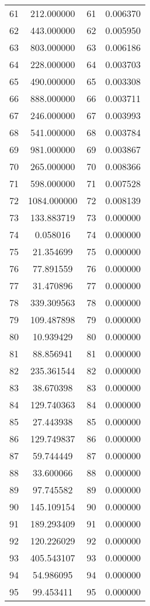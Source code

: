 \documentclass[12pt]{article}
\begin{document}
\begin{longtable}{@{}cccc@{}}
61 & 212.000000 & 61 & 0.006370 \\
62 & 443.000000 & 62 & 0.005950 \\
63 & 803.000000 & 63 & 0.006186 \\
64 & 228.000000 & 64 & 0.003703 \\
65 & 490.000000 & 65 & 0.003308 \\
66 & 888.000000 & 66 & 0.003711 \\
67 & 246.000000 & 67 & 0.003993 \\
68 & 541.000000 & 68 & 0.003784 \\
69 & 981.000000 & 69 & 0.003867 \\
70 & 265.000000 & 70 & 0.008366 \\
71 & 598.000000 & 71 & 0.007528 \\
72 & 1084.000000 & 72 & 0.008139 \\
73 & 133.883719 & 73 & 0.000000 \\
74 & 0.058016 & 74 & 0.000000 \\
75 & 21.354699 & 75 & 0.000000 \\
76 & 77.891559 & 76 & 0.000000 \\
77 & 31.470896 & 77 & 0.000000 \\
78 & 339.309563 & 78 & 0.000000 \\
79 & 109.487898 & 79 & 0.000000 \\
80 & 10.939429 & 80 & 0.000000 \\
81 & 88.856941 & 81 & 0.000000 \\
82 & 235.361544 & 82 & 0.000000 \\
83 & 38.670398 & 83 & 0.000000 \\
84 & 129.740363 & 84 & 0.000000 \\
85 & 27.443938 & 85 & 0.000000 \\
86 & 129.749837 & 86 & 0.000000 \\
87 & 59.744449 & 87 & 0.000000 \\
88 & 33.600066 & 88 & 0.000000 \\
89 & 97.745582 & 89 & 0.000000 \\
90 & 145.109154 & 90 & 0.000000 \\
91 & 189.293409 & 91 & 0.000000 \\
92 & 120.226029 & 92 & 0.000000 \\
93 & 405.543107 & 93 & 0.000000 \\
94 & 54.986095 & 94 & 0.000000 \\
95 & 99.453411 & 95 & 0.000000 \\

\end{longtable}
\end{document}
